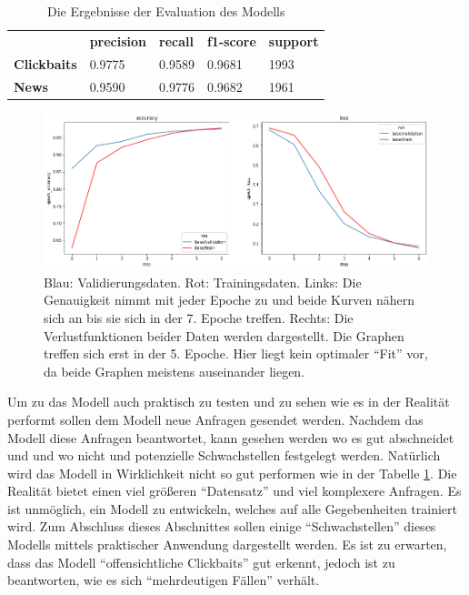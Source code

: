 \begin{table}[h]
    \caption{Die Ergebnisse der Evaluation des Modells}
    \label{eval1}
    \renewcommand{\arraystretch}{1.2}
    \centering
    \sffamily
    \begin{footnotesize}
        \begin{tabular}{l l l l l}
            \toprule
                           & \textbf{precision} & \textbf{recall} & \textbf{f1-score} & \textbf{support} \\
            \textbf{Clickbaits} & 0.9775                  & 0.9589                 & 0.9681                & 1993          \\
            \textbf{News}  & 0.9590                 & 0.9776                & 0.9682               & 1961                     \\
            \bottomrule
        \end{tabular}
    \end{footnotesize}
    \rmfamily
\end{table}

\begin{figure}[H]
    \centering
    \includegraphics[width=15cm]{kapitel5/basemodel.png}
    \caption[Vergleich der Trainingsdaten mit den Validierungsdaten]{Blau: Validierungsdaten. Rot: Trainingsdaten. Links: Die Genauigkeit nimmt mit jeder Epoche zu und beide Kurven nähern sich an bis sie sich in der 7. Epoche treffen. Rechts: Die Verlustfunktionen beider Daten werden dargestellt. Die Graphen treffen sich erst in der 5. Epoche. Hier liegt kein optimaler \enquote{Fit} vor, da beide Graphen meistens auseinander liegen.}
    \label{Kap5:Val}
\end{figure}


Um zu das Modell auch praktisch zu testen und zu sehen wie es in der Realität performt sollen dem Modell neue Anfragen gesendet werden. Nachdem das Modell diese Anfragen beantwortet, kann gesehen werden wo es gut abschneidet und und wo nicht und potenzielle Schwachstellen festgelegt werden. Natürlich wird das Modell in Wirklichkeit nicht so gut performen wie in der Tabelle \ref{eval1}. Die Realität bietet einen viel größeren \enquote{Datensatz} und viel komplexere Anfragen. Es ist unmöglich, ein Modell zu entwickeln, welches auf alle Gegebenheiten trainiert wird. Zum Abschluss dieses Abschnittes sollen einige \enquote{Schwachstellen} dieses Modells mittels praktischer Anwendung dargestellt werden. Es ist zu erwarten, dass das Modell \enquote{offensichtliche Clickbaits} gut erkennt, jedoch ist zu beantworten, wie es sich \enquote{mehrdeutigen Fällen} verhält. 



